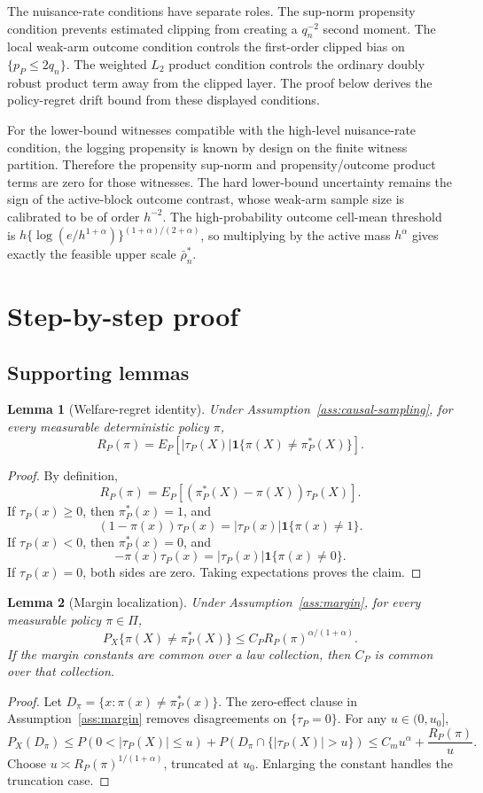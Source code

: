 \documentclass[11pt]{article}
\newcommand{\one}{\mathbf{1}}
\theoremstyle{definition}
\theoremstyle{plain}
\newtheorem{lemma}{Lemma}
\theoremstyle{remark}
\begin{document}
The nuisance-rate conditions have separate roles.  The sup-norm propensity
condition prevents estimated clipping from creating a \(q_n^{-2}\) second
moment.  The local weak-arm outcome condition controls the first-order
clipped bias on \(\{p_P\le2q_n\}\).  The weighted \(L_2\) product condition
controls the ordinary doubly robust product term away from the clipped
layer.  The proof below derives the policy-regret drift bound from these
displayed conditions.

For the lower-bound witnesses compatible with the high-level nuisance-rate
condition, the logging propensity is known by design on the finite witness
partition.  Therefore the propensity sup-norm and propensity/outcome product
terms are zero for those witnesses.  The hard lower-bound uncertainty remains
the sign of the active-block outcome contrast, whose weak-arm sample size is
calibrated to be of order \(h^{-2}\).  The high-probability outcome
cell-mean threshold is \(h\{\log(e/h^{1+\alpha})\}^{(1+\alpha)/(2+\alpha)}\),
so multiplying by the active mass \(h^\alpha\) gives exactly the feasible
upper scale \(\bar\rho_n^*\).

\section{Step-by-step proof}
\subsection*{Supporting lemmas}
\begin{lemma}[Welfare-regret identity]\label{lem:welfare-identity}
Under Assumption~\ref{ass:causal-sampling}, for every measurable
deterministic policy \(\pi\),
\[
R_P(\pi)=E_P[|\tau_P(X)|\one\{\pi(X)\ne\pi_P^*(X)\}].
\]
\end{lemma}
\begin{proof}
By definition,
\[
R_P(\pi)
=E_P[(\pi_P^*(X)-\pi(X))\tau_P(X)].
\]
If \(\tau_P(x)\ge0\), then \(\pi_P^*(x)=1\), and
\[
(1-\pi(x))\tau_P(x)
=|\tau_P(x)|\one\{\pi(x)\ne1\}.
\]
If \(\tau_P(x)<0\), then \(\pi_P^*(x)=0\), and
\[
-\pi(x)\tau_P(x)
=|\tau_P(x)|\one\{\pi(x)\ne0\}.
\]
If \(\tau_P(x)=0\), both sides are zero.  Taking expectations proves the
claim.
\end{proof}

\begin{lemma}[Margin localization]\label{lem:margin-localization}
Under Assumption~\ref{ass:margin}, for every measurable policy \(\pi\in\Pi\),
\[
P_X\{\pi(X)\ne\pi_P^*(X)\}
\le C_P R_P(\pi)^{\alpha/(1+\alpha)}.
\]
If the margin constants are common over a law collection, then \(C_P\) is
common over that collection.
\end{lemma}
\begin{proof}
Let \(D_\pi=\{x:\pi(x)\ne\pi_P^*(x)\}\).  The zero-effect clause in
Assumption~\ref{ass:margin} removes disagreements on \(\{\tau_P=0\}\).  For
any \(u\in(0,u_0]\),
\[
P_X(D_\pi)
\le
P(0<|\tau_P(X)|\le u)
+P(D_\pi\cap\{|\tau_P(X)|>u\})
\le C_m u^\alpha+\frac{R_P(\pi)}{u}.
\]
Choose \(u\asymp R_P(\pi)^{1/(1+\alpha)}\), truncated at \(u_0\).  Enlarging
the constant handles the truncation case.
\end{proof}
\end{document}
